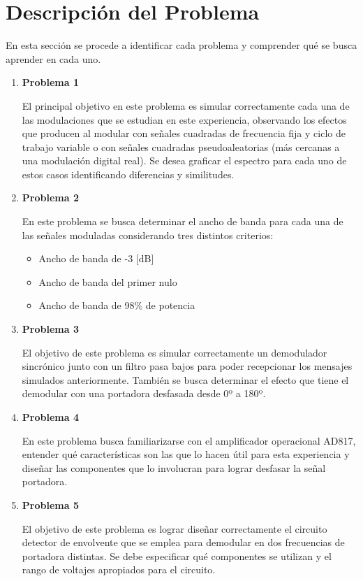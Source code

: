 \documentclass[letterpaper, titlepage]{article}
\begin{document}
\section{Descripción del Problema}
	En esta sección se procede a identificar cada problema y comprender qué se busca aprender en cada uno.
	\begin{enumerate}
		\item \textbf{Problema 1}
		
			El principal objetivo en este problema es simular correctamente cada una de las modulaciones que se estudian en este experiencia, observando los efectos que producen al modular con señales cuadradas de frecuencia fija y ciclo de trabajo variable o con señales cuadradas pseudoaleatorias (más cercanas a una modulación digital real). Se desea graficar el espectro para cada uno de estos casos identificando diferencias y similitudes.
		\item \textbf{Problema 2}
		
			En este problema se busca determinar el ancho de banda para cada una de las señales moduladas considerando tres distintos criterios:
			\begin{itemize}
				\item Ancho de banda de -3 [dB]
				\item Ancho de banda del primer nulo
				\item Ancho de banda de 98\% de potencia
			\end{itemize}
			
		\item \textbf{Problema 3}
		
			El objetivo de este problema es simular correctamente un demodulador sincrónico junto con un filtro pasa bajos para poder recepcionar los mensajes simulados anteriormente. También se busca determinar el efecto que tiene el demodular con una portadora desfasada desde 0º a 180º.
		\item \textbf{Problema 4}
		
			En este problema busca familiarizarse con el amplificador operacional AD817, entender qué características son las que lo hacen útil para esta experiencia y diseñar las componentes que lo involucran para lograr desfasar la señal portadora.
		\item \textbf{Problema 5}
		
			El objetivo de este problema es lograr diseñar correctamente el circuito detector de envolvente que se emplea para demodular en dos frecuencias de portadora distintas. Se debe especificar qué componentes se utilizan y el rango de voltajes apropiados para el circuito.
	\end{enumerate}
\newpage
\end{document}
